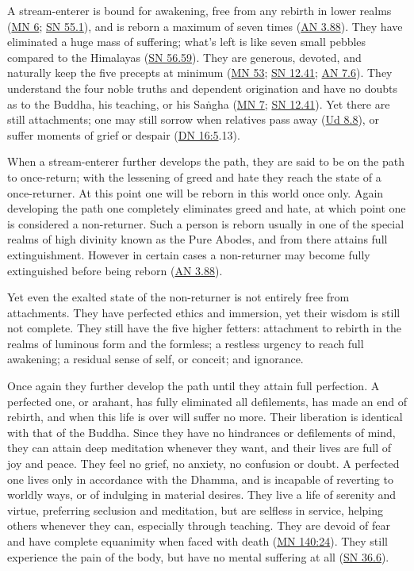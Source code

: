 \documentclass[12pt,openany]{book}%
\begin{document}
A stream-enterer is bound for awakening, free from any rebirth in lower realms (\href{https://suttacentral.net/mn6}{MN 6}; \href{https://suttacentral.net/sn55.1}{SN 55.1}), and is reborn a maximum of seven times (\href{https://suttacentral.net/an3.88}{AN 3.88}). They have eliminated a huge mass of suffering; what’s left is like seven small pebbles compared to the Himalayas (\href{https://suttacentral.net/sn56.59}{SN 56.59}). They are generous, devoted, and naturally keep the five precepts at minimum (\href{https://suttacentral.net/mn53}{MN 53}; \href{https://suttacentral.net/sn12.41}{SN 12.41}; \href{https://suttacentral.net/an7.6}{AN 7.6}). They understand the four noble truths and dependent origination and have no doubts as to the Buddha, his teaching, or his \textsanskrit{Saṅgha} (\href{https://suttacentral.net/mn7}{MN 7}; \href{https://suttacentral.net/sn12.41}{SN 12.41}). Yet there are still attachments; one may still sorrow when relatives pass away (\href{https://suttacentral.net/ud8.8}{Ud 8.8}), or suffer moments of grief or despair (\href{https://suttacentral.net/dn16\#5}{DN 16:5}.13).

When a stream-enterer further develops the path, they are said to be on the path to once-return; with the lessening of greed and hate they reach the state of a once-returner. At this point one will be reborn in this world once only. Again developing the path one completely eliminates greed and hate, at which point one is considered a non-returner. Such a person is reborn usually in one of the special realms of high divinity known as the Pure Abodes, and from there attains full extinguishment. However in certain cases a non-returner may become fully extinguished before being reborn (\href{https://suttacentral.net/an3.88}{AN 3.88}).

Yet even the exalted state of the non-returner is not entirely free from attachments. They have perfected ethics and immersion, yet their wisdom is still not complete. They still have the five higher fetters: attachment to rebirth in the realms of luminous form and the formless; a restless urgency to reach full awakening; a residual sense of self, or conceit; and ignorance.

Once again they further develop the path until they attain full perfection. A perfected one, or arahant, has fully eliminated all defilements, has made an end of rebirth, and when this life is over will suffer no more. Their liberation is identical with that of the Buddha. Since they have no hindrances or defilements of mind, they can attain deep meditation whenever they want, and their lives are full of joy and peace. They feel no grief, no anxiety, no confusion or doubt. A perfected one lives only in accordance with the Dhamma, and is incapable of reverting to worldly ways, or of indulging in material desires. They live a life of serenity and virtue, preferring seclusion and meditation, but are selfless in service, helping others whenever they can, especially through teaching. They are devoid of fear and have complete equanimity when faced with death (\href{https://suttacentral.net/mn140\#24}{MN 140:24}). They still experience the pain of the body, but have no mental suffering at all (\href{https://suttacentral.net/sn36.6}{SN 36.6}).
\end{document}
